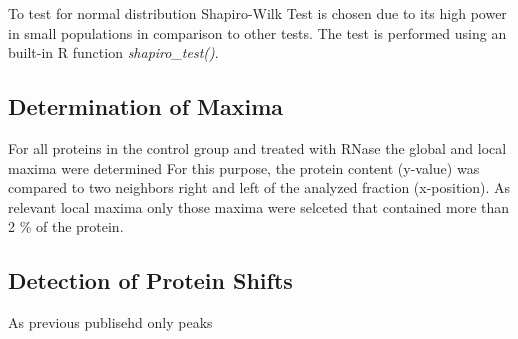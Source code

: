 \documentclass[
]{article}
\begin{document}
To test for normal distribution Shapiro-Wilk Test is chosen due to its
high power in small populations in comparison to other tests. The test
is performed using an built-in R function \emph{shapiro\_test()}.

\hypertarget{determination-of-maxima}{%
\subsection{Determination of Maxima}\label{determination-of-maxima}}

For all proteins in the control group and treated with RNase the global
and local maxima were determined For this purpose, the protein content
(y-value) was compared to two neighbors right and left of the analyzed
fraction (x-position). As relevant local maxima only those maxima were
selceted that contained more than 2 \% of the protein.

\hypertarget{detection-of-protein-shifts}{%
\subsection{Detection of Protein
Shifts}\label{detection-of-protein-shifts}}

As previous publisehd only peaks
\end{document}
